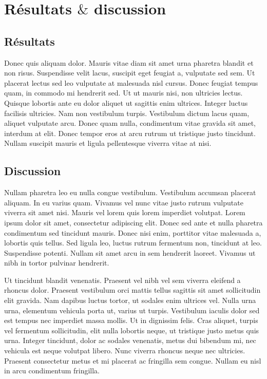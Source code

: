 \chapter{Résultats $\&$  discussion}
\minitoc

\section{Résultats}

Donec quis aliquam dolor. Mauris vitae diam sit amet urna pharetra blandit et non risus. Suspendisse velit lacus, suscipit eget feugiat a, vulputate sed sem. Ut placerat lectus sed leo vulputate at malesuada nisl cursus. Donec feugiat tempus quam, in commodo mi hendrerit sed. Ut ut mauris nisi, non ultricies lectus. Quisque lobortis ante eu dolor aliquet ut sagittis enim ultrices. Integer luctus facilisis ultricies. Nam non vestibulum turpis. Vestibulum dictum lacus quam, aliquet vulputate arcu. Donec quam nulla, condimentum vitae gravida sit amet, interdum at elit. Donec tempor eros at arcu rutrum ut tristique justo tincidunt. Nullam suscipit mauris et ligula pellentesque viverra vitae at nisi. 

\section{Discussion}

Nullam pharetra leo eu nulla congue vestibulum. Vestibulum accumsan placerat aliquam. In eu varius quam. Vivamus vel nunc vitae justo rutrum vulputate viverra sit amet nisi. Mauris vel lorem quis lorem imperdiet volutpat. Lorem ipsum dolor sit amet, consectetur adipiscing elit. Donec sed ante et nulla pharetra condimentum sed tincidunt mauris. Donec nisi enim, porttitor vitae malesuada a, lobortis quis tellus. Sed ligula leo, luctus rutrum fermentum non, tincidunt at leo. Suspendisse potenti. Nullam sit amet arcu in sem hendrerit laoreet. Vivamus ut nibh in tortor pulvinar hendrerit. 

Ut tincidunt blandit venenatis. Praesent vel nibh vel sem viverra eleifend a rhoncus dolor. Praesent vestibulum orci mattis tellus sagittis sit amet sollicitudin elit gravida. Nam dapibus luctus tortor, ut sodales enim ultrices vel. Nulla urna urna, elementum vehicula porta ut, varius ut turpis. Vestibulum iaculis dolor sed est tempus nec imperdiet massa mollis. Ut in dignissim felis. Cras aliquet, turpis vel fermentum sollicitudin, elit nulla lobortis neque, ut tristique justo metus quis urna. Integer tincidunt, dolor ac sodales venenatis, metus dui bibendum mi, nec vehicula est neque volutpat libero. Nunc viverra rhoncus neque nec ultricies. Praesent consectetur metus et mi placerat ac fringilla sem congue. Nullam eu nisl in arcu condimentum fringilla. 